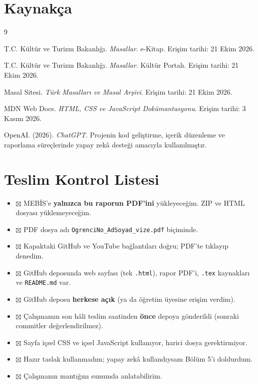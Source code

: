 \documentclass[12pt,a4paper]{article}
\begin{document}
\section{Kaynakça}

\begin{thebibliography}{9}

 T.C. Kültür ve Turizm Bakanlığı. \emph{Masallar}. e-Kitap. Erişim tarihi: 21 Ekim 2026.

 T.C. Kültür ve Turizm Bakanlığı. \emph{Masallar}. Kültür Portalı. Erişim tarihi: 21 Ekim 2026.

 Masal Sitesi. \emph{Türk Masalları ve Masal Arşivi}. Erişim tarihi: 21 Ekim 2026.

 MDN Web Docs. \emph{HTML, CSS ve JavaScript Dokümantasyonu}. Erişim tarihi: 3 Kasım 2026.

 OpenAI. (2026). \emph{ChatGPT}. Projenin kod geliştirme, içerik düzenleme ve raporlama süreçlerinde yapay zekâ desteği amacıyla kullanılmıştır.

\end{thebibliography}


\appendix
\section{Teslim Kontrol Listesi}

\begin{itemize}
  \item $\boxtimes$ MEBİS'e \textbf{yalnızca bu raporun PDF'ini} yükleyeceğim. ZIP ve HTML dosyası yüklemeyeceğim.
  \item $\boxtimes$ PDF dosya adı \texttt{OgrenciNo\_AdSoyad\_vize.pdf} biçiminde.
  \item $\boxtimes$ Kapaktaki GitHub ve YouTube bağlantıları doğru; PDF'te tıklayıp denedim.
  \item $\boxtimes$ GitHub deposunda web sayfası (tek \texttt{.html}), rapor PDF'i, \texttt{.tex} kaynakları ve \texttt{README.md} var.
  \item $\boxtimes$ GitHub deposu \textbf{herkese açık} (ya da öğretim üyesine erişim verdim).
  \item $\boxtimes$ Çalışmamın son hâli teslim saatinden \textbf{önce} depoya gönderildi (sonraki commitler değerlendirilmez).
  \item $\boxtimes$ Sayfa içsel CSS ve içsel JavaScript kullanıyor, harici dosya gerektirmiyor.
  \item $\boxtimes$ Hazır taslak kullanmadım; yapay zekâ kullandıysam Bölüm 5'i doldurdum.
  \item $\boxtimes$ Çalışmanın mantığını sunumda anlatabilirim.
\end{itemize}
\end{document}
